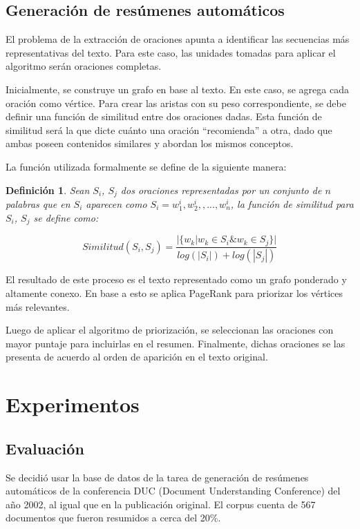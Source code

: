 \documentclass{llncs}
\newtheorem{definicion}{Definición}
\begin{document}
\subsection{Generación de resúmenes automáticos}
El problema de la extracción de oraciones apunta a identificar las secuencias más representativas del texto. Para este caso, las unidades tomadas para aplicar el algoritmo serán oraciones completas.

Inicialmente, se construye un grafo en base al texto. En este caso, se agrega cada oración como vértice. Para crear las aristas con su peso correspondiente, se debe definir una función de similitud entre dos oraciones dadas. Esta función de similitud será la que dicte cuánto una oración “recomienda” a otra, dado que ambas poseen contenidos similares y abordan los mismos conceptos.
    
La función utilizada formalmente se define de la siguiente manera:


\begin{definicion}
Sean $S_i$, $S_j$ dos oraciones representadas por un conjunto de $n$ palabras que en 
$S_i$ aparecen como $S_i = w_{1}^{i}, w_{2}^{i},,..., w_{n}^{i}$, la función de similitud para $S_i$, $S_j$ se define como:


\begin{equation}
Similitud(S_{i},S_{j}) = \frac{ | \{   w_{k} | w_{k} \in S_{i} \& w_{k} \in S_{j}   \}  | }    
                              {  log(|S_{i}|) + log(|S_{j}|)  }
\end{equation}


\end{definicion}
    
El resultado de este proceso es el texto representado como un grafo ponderado y altamente conexo. En base a esto se aplica PageRank para priorizar los vértices más relevantes.

Luego de aplicar el algoritmo de priorización, se seleccionan las oraciones con mayor puntaje para incluirlas en el resumen. Finalmente, dichas oraciones se las presenta de acuerdo al orden de aparición en el texto original.


\section{Experimentos}

\subsection{Evaluación}
Se decidió usar la base de datos de la tarea de generación de resúmenes automáticos de la conferencia DUC (Document Understanding Conference) del año 2002, al igual que en la publicación original. El corpus cuenta de 567 documentos que fueron resumidos a cerca del 20\%.
\end{document}
